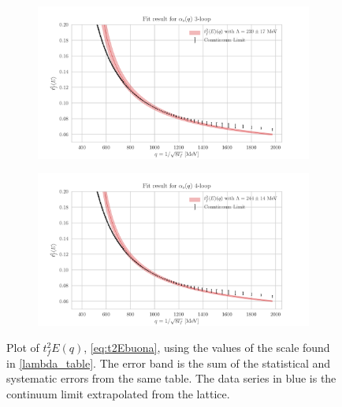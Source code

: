 \begin{figure}[hbt!]
    \centering
    \begin{subfigure}{0.7\textwidth}
        \centering
        \includegraphics[width=1\textwidth]{results/End3.pdf}
    \end{subfigure}
    \begin{subfigure}{0.7\textwidth}
        \centering
        \includegraphics[width=1\textwidth]{results/End4.pdf}        
    \end{subfigure}
    \caption{Plot of $t_f^2E(q)$, \cref{eq:t2Ebuona}, using the values of the scale found in \cref{lambda_table}. The error band is the sum of the statistical and systematic errors from the same table. The data series in blue is the continuum limit extrapolated from the lattice.}
    \label{fig:end1}
\end{figure}

